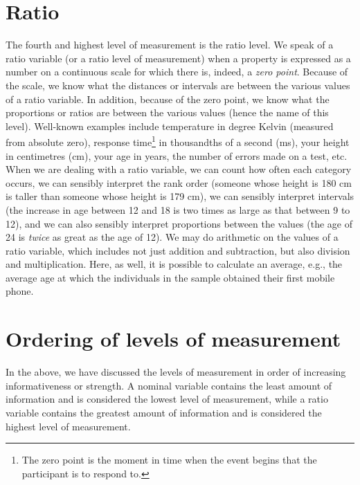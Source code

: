 \documentclass[
]{book}
\begin{document}
\hypertarget{sec:ratio}{%
\section{Ratio}\label{sec:ratio}}

The fourth and highest level of measurement is the ratio level. We speak of a ratio variable (or a ratio level of measurement) when a property is expressed as a number on a continuous scale for which there is, indeed, a \emph{zero point}. Because of the scale, we know what the distances or intervals are between the various values of a ratio variable. In addition, because of the zero point, we know what the proportions or ratios are between the various values (hence the name of this level). Well-known examples include temperature in degree Kelvin (measured from absolute zero), response time\footnote{The zero point is the moment in time when the event begins that the participant is to respond to.} in thousandths of a second (ms), your height in centimetres (cm), your age in years, the number of errors made on a test, etc. When we are dealing with a ratio variable, we can count how often each category occurs, we can sensibly interpret the rank order (someone whose height is 180 cm is taller than someone whose height is 179 cm), we can sensibly interpret intervals (the increase in age between 12 and 18 is two times as large as that between 9 to 12), and we can also sensibly interpret proportions between the values (the age of 24 is \emph{twice} as great as the age of 12). We may do arithmetic on the values of a ratio variable, which includes not just addition and subtraction, but also division and multiplication. Here, as well, it is possible to calculate an average, e.g., the average age at which the individuals in the sample obtained their first mobile phone.

\hypertarget{sec:orderinglevelsofmeasurement}{%
\section{Ordering of levels of measurement}\label{sec:orderinglevelsofmeasurement}}

In the above, we have discussed the levels of measurement in order of increasing informativeness or strength. A nominal variable contains the least amount of information and is considered the lowest level of measurement, while a ratio variable contains the greatest amount of information and is considered the highest level of measurement.
\end{document}
